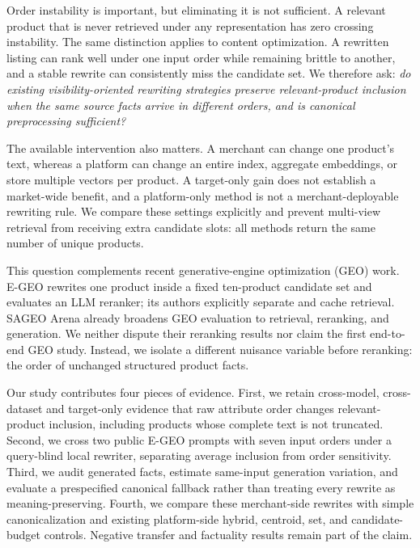 Order instability is important, but eliminating it is not sufficient. A relevant product that is never retrieved under any representation has zero crossing instability. The same distinction applies to content optimization. A rewritten listing can rank well under one input order while remaining brittle to another, and a stable rewrite can consistently miss the candidate set. We therefore ask: \emph{do existing visibility-oriented rewriting strategies preserve relevant-product inclusion when the same source facts arrive in different orders, and is canonical preprocessing sufficient?}

The available intervention also matters. A merchant can change one product's text, whereas a platform can change an entire index, aggregate embeddings, or store multiple vectors per product. A target-only gain does not establish a market-wide benefit, and a platform-only method is not a merchant-deployable rewriting rule. We compare these settings explicitly and prevent multi-view retrieval from receiving extra candidate slots: all methods return the same number of unique products.

This question complements recent generative-engine optimization (GEO) work. E-GEO rewrites one product inside a fixed ten-product candidate set and evaluates an LLM reranker; its authors explicitly separate and cache retrieval. SAGEO Arena already broadens GEO evaluation to retrieval, reranking, and generation. We neither dispute their reranking results nor claim the first end-to-end GEO study. Instead, we isolate a different nuisance variable before reranking: the order of unchanged structured product facts.

Our study contributes four pieces of evidence. First, we retain cross-model, cross-dataset and target-only evidence that raw attribute order changes relevant-product inclusion, including products whose complete text is not truncated. Second, we cross two public E-GEO prompts with seven input orders under a query-blind local rewriter, separating average inclusion from order sensitivity. Third, we audit generated facts, estimate same-input generation variation, and evaluate a prespecified canonical fallback rather than treating every rewrite as meaning-preserving. Fourth, we compare these merchant-side rewrites with simple canonicalization and existing platform-side hybrid, centroid, set, and candidate-budget controls. Negative transfer and factuality results remain part of the claim.
